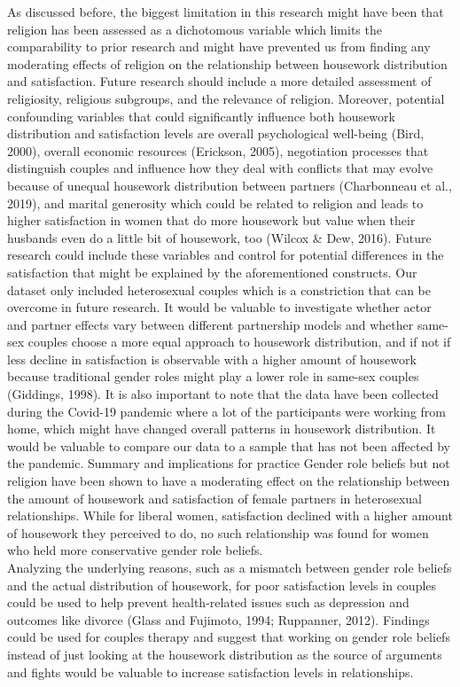 \documentclass[
  man,floatsintext]{apa6}
\begin{document}
As discussed before, the biggest limitation in this research might have been that religion has been assessed as a dichotomous variable which limits the comparability to prior research and might have prevented us from finding any moderating effects of religion on the relationship between housework distribution and satisfaction. Future research should include a more detailed assessment of religiosity, religious subgroups, and the relevance of religion.
Moreover, potential confounding variables that could significantly influence both housework distribution and satisfaction levels are overall psychological well-being (Bird, 2000), overall economic resources (Erickson, 2005), negotiation processes that distinguish couples and influence how they deal with conflicts that may evolve because of unequal housework distribution between partners (Charbonneau et al., 2019), and marital generosity which could be related to religion and leads to higher satisfaction in women that do more housework but value when their husbands even do a little bit of housework, too (Wilcox \& Dew, 2016). Future research could include these variables and control for potential differences in the satisfaction that might be explained by the aforementioned constructs.
Our dataset only included heterosexual couples which is a constriction that can be overcome in future research. It would be valuable to investigate whether actor and partner effects vary between different partnership models and whether same-sex couples choose a more equal approach to housework distribution, and if not if less decline in satisfaction is observable with a higher amount of housework because traditional gender roles might play a lower role in same-sex couples (Giddings, 1998).
It is also important to note that the data have been collected during the Covid-19 pandemic where a lot of the participants were working from home, which might have changed overall patterns in housework distribution. It would be valuable to compare our data to a sample that has not been affected by the pandemic.
Summary and implications for practice
Gender role beliefs but not religion have been shown to have a moderating effect on the relationship between the amount of housework and satisfaction of female partners in heterosexual relationships. While for liberal women, satisfaction declined with a higher amount of housework they perceived to do, no such relationship was found for women who held more conservative gender role beliefs.\\
Analyzing the underlying reasons, such as a mismatch between gender role beliefs and the actual distribution of housework, for poor satisfaction levels in couples could be used to help prevent health-related issues such as depression and outcomes like divorce (Glass and Fujimoto, 1994; Ruppanner, 2012). Findings could be used for couples therapy and suggest that working on gender role beliefs instead of just looking at the housework distribution as the source of arguments and fights would be valuable to increase satisfaction levels in relationships.
\end{document}
